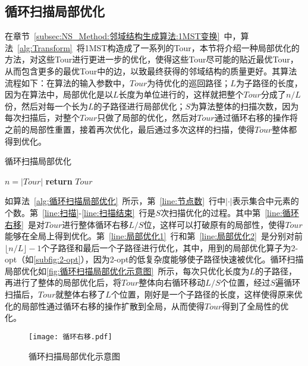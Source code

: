 \subsection{循环扫描局部优化}
\label{subsec:NS_Method:邻域结构生成算法:循环扫描局部优化}
在章节~\ref{subsec:NS_Method:邻域结构生成算法:1MST变换}~中，算法~\ref{alg:Transform}~将1MST构造成了一系列的Tour，本节将介绍一种局部优化的方法，对这些Tour进行更进一步的优化，使得这些Tour尽可能的贴近最优Tour，从而包含更多的最优Tour中的边，以致最终获得的邻域结构的质量更好。其算法流程如下：在算法的输入参数中，$Tour$为待优化的巡回路径；$L$为子路径的长度，因为在算法中，局部优化是以$L$长度为单位进行的，这样就把整个$Tour$分成了$n/L$份，然后对每一个长为$L$的子路径进行局部优化；$S$为算法整体的扫描次数，因为每次扫描后，对整个$Tour$只做了局部的优化，然后对$Tour$通过循环右移的操作将之前的局部性重置，接着再次优化，最后通过多次这样的扫描，使得$Tour$整体都得到优化。
\begin{algorithm}[htb]
    \caption{循环扫描局部优化}
    \label{alg:循环扫描局部优化}
    \BlankLine
    $n = |Tour|$ \label{line:节点数} \;
    \label{line:扫描结束}
    \textbf{return } $Tour$ \;
\end{algorithm}
\par
如算法~\ref{alg:循环扫描局部优化}~所示，第~\ref{line:节点数}~行中$|\cdot|$表示集合中元素的个数。第~\ref{line:扫描}-\ref{line:扫描结束}~行是$S$次扫描优化的过程。其中第~\ref{line:循环右移}~是对$Tour$进行整体循环右移$L/S$位，这样可以打破原有的局部性，使得$Tour$能够在全局上得到优化。第~\ref{line:局部优化1}~行和第~\ref{line:局部优化2}~是分别对前$\lfloor n/L \rfloor - 1$个子路径和最后一个子路径进行优化，其中，用到的局部优化算子为2-opt（如\autoref{subfig:2-opt}），因为2-opt的低复杂度能够使子路径快速被优化。循环扫描局部优化如\autoref{fig:循环扫描局部优化示意图}~所示，每次只优化长度为$L$的子路径，再进行了整体的局部优化后，将$Tour$整体向右循环移动$L/S$个位置，经过$S$遍循环扫描后，$Tour$就整体右移了$L$个位置，刚好是一个子路径的长度，这样使得原来优化的局部性通过循环右移的操作扩散到全局，从而使得$Tour$得到了全局性的优化。
\begin{figure}[!htb]
    \texttt{[image: 循环右移.pdf]}
    \caption[循环扫描局部优化示意图]{循环扫描局部优化示意图}
    \label{fig:循环扫描局部优化示意图}
\end{figure}

